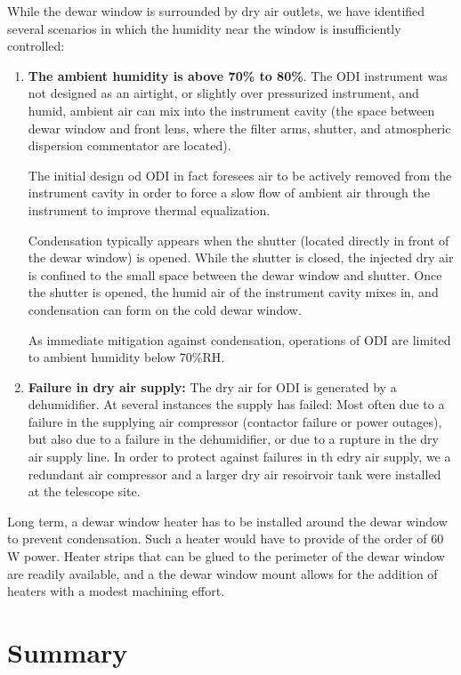 \documentclass[]{spieman}
\begin{document}
While the dewar window is surrounded by dry air outlets, we have identified
several scenarios in which the humidity near the window is insufficiently
controlled:

\begin{enumerate}
	\item {\bf The ambient humidity is above 70\% to 80\%}. The ODI instrument 
	was not designed as an airtight, or slightly over pressurized instrument, 
	and humid, ambient air can mix into the instrument cavity (the space 
	between dewar window and front lens, where the filter arms, shutter, and 
	atmospheric dispersion commentator are located).
	
	The initial design od ODI in fact foresees air to be actively removed from 
	the instrument cavity in order to force a slow flow of ambient air through 
	the instrument to improve thermal equalization. 
	
	Condensation typically appears when the shutter (located directly in front 
	of the dewar window) is opened. While the shutter is closed, the injected 
	dry air is confined to the small space between the dewar window and 
	shutter. Once the shutter is opened, the  humid air of the instrument 
	cavity mixes in, and condensation can form on the cold dewar window. 
	
	As immediate mitigation against condensation, operations of ODI are limited 
	to ambient humidity below 70\%RH.
	
	\item {\bf Failure in dry air supply:} The dry air for ODI is generated by 
	a dehumidifier. At several instances the supply has failed: Most often due 
	to a failure in the supplying air compressor (contactor failure or power 
	outages), but also due to a failure in the dehumidifier, or due to a 
	rupture in the dry air supply line. In order to protect against failures in 
	th edry air supply, we a redundant air compressor and a larger dry air 
	resoirvoir tank were installed at the telescope site. 

\end{enumerate}

Long term, a dewar window heater has to be installed  around the dewar window 
to prevent condensation. Such a heater would have to provide of the order of 60 
W power. Heater strips that can be glued to the perimeter of the dewar window 
are readily available, and a the dewar window mount allows for the addition of 
heaters with a modest machining effort.  


\section{Summary}
\end{document}

